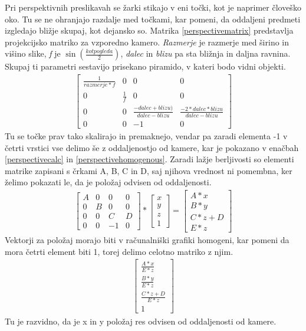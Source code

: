 \documentclass[a4paper, 12pt]{book}
\begin{document}
Pri perspektivnih preslikavah se žarki stikajo v eni točki, kot je naprimer človeško oko. Tu se ne ohranjajo razdalje med točkami, kar pomeni, da oddaljeni predmeti izgledajo bližje skupaj, kot dejansko so. Matrika \ref{perspectivematrix} predstavlja projekcijsko matriko za vzporedno kamero. \emph{Razmerje} je razmerje med širino in višino slike, \emph{f} je $\sin (\frac{kot pogleda}{2})$, \emph{dalec} in \emph{blizu} pa sta bližnja in daljna ravnina. Skupaj ti parametri sestavijo prisekano piramido, v kateri bodo vidni objekti.
\begin{align}
\begin{bmatrix}
\frac{1}{razmerje*f} & 0 & 0 & 0 \\ 
0 & \frac{1}{f} & 0 & 0 \\ 
0 & 0 & \frac{-dalec+blizu)}{dalec-blizu} & \frac{-2*dalec*blizu}{dalec-blizu} \\ 
0 & 0 & -1 & 0
\end{bmatrix}
\label{perspectivematrix}
\end{align}
Tu se točke prav tako skalirajo in premaknejo, vendar pa zaradi elementa -1 v četrti vrstici vse delimo še z oddaljenostjo od kamere, kar je pokazano v enačbah \ref{perspectivecalc} in \ref{perspectivehomogenous}. Zaradi lažje berljivosti so elementi matrike zapisani s črkami A, B, C in D, saj njihova vrednost ni pomembna, ker želimo pokazati le, da je položaj odvisen od oddaljenosti.
\begin{align}
\begin{bmatrix}
A & 0 & 0 & 0 \\ 
0 & B & 0 & 0 \\ 
0 & 0 & C & D \\ 
0 & 0 & -1 & 0
\end{bmatrix}
*
\begin{bmatrix}
x \\ y \\ z \\ 1
\end{bmatrix}	
=
\begin{bmatrix}
A*x \\
B*y \\
C*z+D \\
E*z
\end{bmatrix}
\label{perspectivecalc}
\end{align}
Vektorji za položaj morajo biti v računalniški grafiki homogeni, kar pomeni da mora četrti element biti 1, torej delimo celotno matriko z njim.
\begin{align}
\begin{bmatrix}
\frac{A*x}{E*z} \\ 
\frac{B*y}{E*z} \\
\frac{C*z+D}{E*z} \\
1
\end{bmatrix}
\label{perspectivehomogenous}
\end{align}
Tu je razvidno, da je x in y položaj res odvisen od oddaljenosti od kamere.
\end{document}
